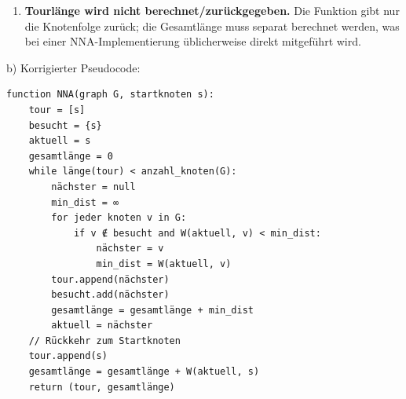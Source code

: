 \documentclass[11pt, a4paper]{article}
\begin{document}
\begin{enumerate}
  \item \textbf{Tourlänge wird nicht berechnet/zurückgegeben.} Die Funktion gibt nur die Knotenfolge zurück; die Gesamtlänge muss separat berechnet werden, was bei einer NNA-Implementierung üblicherweise direkt mitgeführt wird.
\end{enumerate}

b) Korrigierter Pseudocode:


\begin{lstlisting}
function NNA(graph G, startknoten s):
    tour = [s]
    besucht = {s}
    aktuell = s
    gesamtlänge = 0
    while länge(tour) < anzahl_knoten(G):
        nächster = null
        min_dist = ∞
        for jeder knoten v in G:
            if v ∉ besucht and W(aktuell, v) < min_dist:
                nächster = v
                min_dist = W(aktuell, v)
        tour.append(nächster)
        besucht.add(nächster)
        gesamtlänge = gesamtlänge + min_dist
        aktuell = nächster
    // Rückkehr zum Startknoten
    tour.append(s)
    gesamtlänge = gesamtlänge + W(aktuell, s)
    return (tour, gesamtlänge)
\end{lstlisting}





\end{document}
